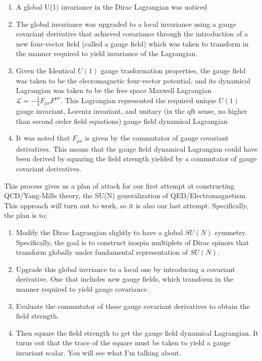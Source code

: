\documentclass[a4]{article}
\begin{document}
    \begin{enumerate}
        \item A global U(1) invariance in the Dirac Lagrangian was noticed
        \item The global invariance was upgraded to a local invariance using a gauge covariant derivative that achieved
        covariance through the introduction of a new four-vector field (called a gauge field) which was taken to transform
        in the manner required to yield invariance of the Lagrangian.
        \item Given the Identical $U(1)$ gauge trasformation properties, the gauge field was taken to be the elecromagnetic
        four-vector potential, and its dynamical Lagrangian was taken to be the free space Maxwell Lagrangian $\mathcal{L}
        = - \frac{1}{4} F_{\mu \nu} F^{\mu \nu}$. This Lagrangian represented the required unique $U(1)$ gauge invariant,
        Lorentz invariant, and unitary (in the qft sense, no higher than second order field equations) gauge field dynamical
        Lagrangian
        \item It was noted that $F_{\mu \nu}$ is given by the commutator of gauge covariant derivatives. This means that the
        gauge field dynamical Lagrangian could have been derived by squaring the field strength yielded by a commutator of
        gauge covariant derivatives.
    \end{enumerate}

    This process gives us a plan of attack for our first attempt at constructing QCD/Yang-Mills theory, the SU(N) generalization
    of QED/Electromagnetism. This approach will turn out to work, so it is also our last attempt. Specifically, the plan is to:

    \begin{enumerate}
        \item Modify the Dirac Lagrangian slightly to have a global $SU(N)$ symmetry. Specifically, the goal is to construct isospin
        multiplets of Dirac spinors that transform globally under fundamental representation of $SU(N)$.
        \item Upgrade this global invriance to a local one by introducing a covariant derivative. One that includes new gauge fields,
        which transform in the manner required to yield gauge covariance. 
        \item Evaluate the commutator of these gauge covariant derivatives to obtain the field strength.
        \item Then square the field strength to get the gauge field dynamical Lagrangian. It turns out that the trace of the square
        must be taken to yield a gauge invariant scalar. You will see what I'm talking about.
    \end{enumerate}
\end{document}
